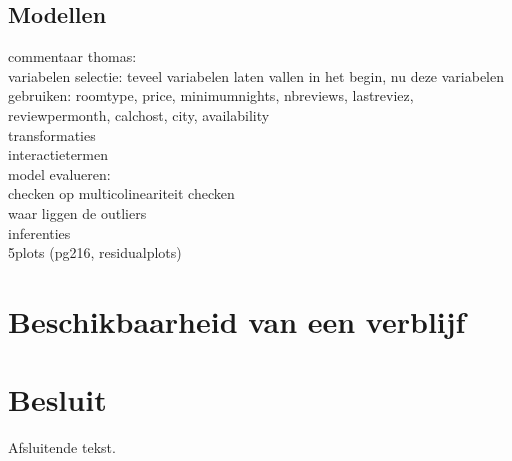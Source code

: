 \documentclass[a4paper,kulak]{kulakarticle} %
\begin{document}
\subsection{Modellen}
commentaar thomas:\\
variabelen selectie: teveel variabelen laten vallen in het begin, nu deze variabelen gebruiken: roomtype, price, minimumnights, nbreviews, lastreviez, reviewpermonth, calchost, city, availability \\
transformaties\\
interactietermen\\

model evalueren:\\
checken op multicolineariteit checken\\
waar liggen de outliers\\
inferenties\\
5plots (pg216, residualplots)

\section{Beschikbaarheid van een verblijf}


\section*{Besluit}

Afsluitende tekst.
\end{document}
